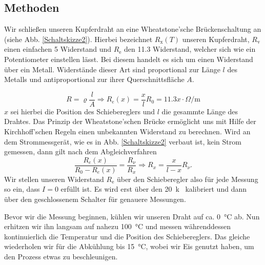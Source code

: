 \documentclass[11pt,a4paper,titlepage, ngerman]{article}
\begin{document}
		\subsection{Methoden} 
		
			Wir schließen unseren Kupferdraht an eine Wheatstone'sche Brückenschaltung an (siehe Abb. \ref{Schaltskizze2}). Hierbei bezeichnet $R_\text{x}(T)$ unseren Kupferdraht, $R_\text{v}$ einen einfachen \SI{5}{\Omega} Widerstand und $R_\text{e}$ den \SI{11,3}{\Omega} Widerstand, welcher sich wie ein Potentiometer einstellen lässt. Bei diesem handelt es sich um einen Widerstand über ein Metall. Widerstände dieser Art sind proportional zur Länge $l$ des Metalls und antiproportional zur ihrer Querschnittsfläche $A$. 
			
			\begin{equation*}
				R = \varrho \frac{l}{A} \Rightarrow R_e(x) = \frac{x}{l} R_0 = \SI{11,3} x \cdot \si{\Omega\per\meter}
			\end{equation*}				
			$x$ sei hierbei die Position des Schiebereglers und $l$ die gesammte Länge des Drahtes.	
			Das Prinzip der Wheatstone'schen Brücke ermöglicht uns mit Hilfe der Kirchhoff'schen Regeln einen unbekannten Widerstand zu berechnen.
			Wird an dem Strommessgerät, wie es in Abb. \ref{Schaltskizze2} verbaut ist, kein Strom gemessen, dann gilt nach dem Abgleichverfahren
			\begin{equation*}
				\frac{R_e(x)}{R_0-R_e(x)} = \frac{R_\nu}{R_x} \Rightarrow R_x = \frac{x}{l-x} R_\nu.
			\end{equation*}
			Wir stellen unseren Widerstand $R_\text{e}$ über den Schieberegler also für jede Messung so ein, dass $I = 0$ erfüllt ist. Es wird erst über den \SI{20}{k\Omega} kalibriert und dann über den geschlossenem Schalter für genauere Messungen.
			
			Bevor wir die Messung beginnen, kühlen wir unseren Draht auf ca. \SI{0}{\celsius} ab.
			Nun erhitzen wir ihn langsam auf nahezu \SI{100}{\celsius} und messen währenddessen kontinuierlich die Temperatur und die Position des Schiebereglers.
			Das gleiche wiederholen wir für die Abkühlung bis \SI{15}{\celsius}, wobei wir Eis genutzt haben, um den Prozess etwas zu beschleunigen.
						
\end{document}
